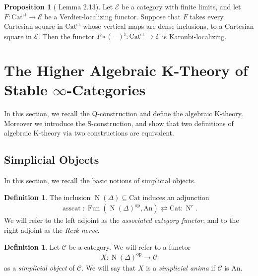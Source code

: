 \documentclass[a4paper,dvipdfmx,11pt,reqno]{amsart}
\DeclareMathOperator{\myop}{op}
\DeclareMathOperator{\N}{N}
\DeclareMathOperator{\Fun}{Fun}
\newcommand{\C}{\mathcal{C}}
\newcommand{\E}{\mathcal{E}}
\DeclareMathOperator{\asscat}{asscat}
\newcommand{\An}{\mathrm{An}}
\newcommand{\Cat}{\mathrm{Cat}}
\newcommand{\Catst}{\mathrm{Cat^{st}}}
\theoremstyle{definition}
\newtheorem{definition}[theorem]{Definition}
\newtheorem{proposition}[theorem]{Proposition}
\begin{document}
\begin{proposition}[\cite{HLS23} Lemma 2.13] \label{HLS23.lem.2.13}
  Let $\E$ be a category with finite limits, and let $F : \Catst \to \E$ be a Verdier-localizing functor.
  Suppose that $F$ takes every Cartesian square in $\Catst$ whose vertical maps are dense inclusions, to a Cartesian square in $\E$. 
  Then the functor $F \circ (-)^{\natural} : \Catst \to \E$ is Karoubi-localizing.
\end{proposition}


\section{The Higher Algebraic K-Theory of Stable \texorpdfstring{$\infty$}{infty}-Categories} \label{sec.algebraic_k_theory}

In this section, we recall the Q-construction and define the algebraic K-theory.
Moreover we introduce the S-construction, and show that two definitions of algebraic K-theory via two constructions are equivalent.

\subsection{Simplicial Objects}

In this section, we recall the basic notions of simplicial objects.

\begin{definition}
  The inclusion $\N(\Delta) \subseteq \Cat$ induces an adjunction 
  \begin{align*}
    \asscat : \Fun(\N(\Delta)^{\myop},\An) \rightleftarrows \Cat : \N^r.
  \end{align*}
  We will refer to the left adjoint as the \textit{associated category functor}, and to the right adjoint as the \textit{Rezk nerve}.
\end{definition}

\begin{definition}
  Let $\C$ be a category.
  We will refer to a functor 
  \begin{align*}
    X : \N(\Delta)^{\myop} \to \C
  \end{align*}
  as a \textit{simplicial object} of $\C$.
  We will say that $X$ is a \textit{simplicial anima} if $\C$ is $\An$.
\end{definition}
\end{document}
